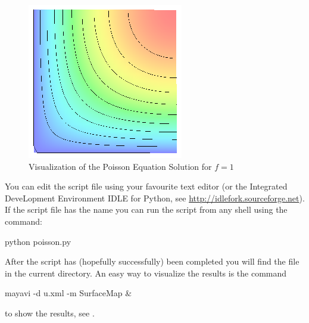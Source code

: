 \begin{figure}
\centerline{\includegraphics[width=\figwidth]{figures/FirstStepResult.eps}}
\caption{Visualization of the Poisson Equation Solution for $f=1$}
\label{fig:FirstSteps.3}
\end{figure}

You can edit the script file using your favourite text editor (or the Integrated DeveLopment Environment IDLE
for Python, see \url{http://idlefork.sourceforge.net}). If the script file has the name   you can run the
script from any shell using the command:
\begin{python} 
python poisson.py
\end{python}
After the script has (hopefully successfully) been completed you will find the file  in the current
directory. An easy way to visualize the results is the command
\begin{python} 
mayavi -d u.xml -m SurfaceMap &
\end{python}
to show the results, see .
